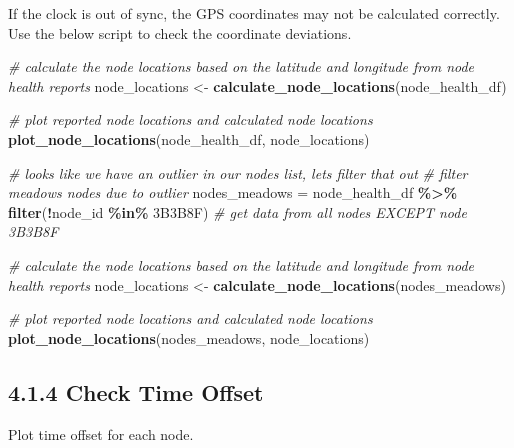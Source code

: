 \documentclass[
]{book}
\newenvironment{Shaded}{\begin{snugshade}}{\end{snugshade}}
\newcommand{\CommentTok}[1]{\textcolor[rgb]{0.56,0.35,0.01}{\textit{#1}}}
\newcommand{\FunctionTok}[1]{\textcolor[rgb]{0.13,0.29,0.53}{\textbf{#1}}}
\newcommand{\NormalTok}[1]{#1}
\newcommand{\OtherTok}[1]{\textcolor[rgb]{0.56,0.35,0.01}{#1}}
\newcommand{\SpecialCharTok}[1]{\textcolor[rgb]{0.81,0.36,0.00}{\textbf{#1}}}
\newcommand{\StringTok}[1]{\textcolor[rgb]{0.31,0.60,0.02}{#1}}
\begin{document}
If the clock is out of sync, the GPS coordinates may not be calculated correctly. Use the below script to check the coordinate deviations.

\begin{Shaded}
\begin{Highlighting}[]
\CommentTok{\# calculate the node locations based on the latitude and longitude from node health reports}
\NormalTok{node\_locations }\OtherTok{\textless{}{-}} \FunctionTok{calculate\_node\_locations}\NormalTok{(node\_health\_df)}

\CommentTok{\# plot reported node locations and calculated node locations}
\FunctionTok{plot\_node\_locations}\NormalTok{(node\_health\_df, node\_locations)}

\CommentTok{\# looks like we have an outlier in our nodes list, let\textquotesingle{}s filter that out}
\CommentTok{\# filter meadows nodes due to outlier}
\NormalTok{nodes\_meadows }\OtherTok{=}\NormalTok{ node\_health\_df }\SpecialCharTok{\%\textgreater{}\%}
  \FunctionTok{filter}\NormalTok{(}\SpecialCharTok{!}\NormalTok{node\_id }\SpecialCharTok{\%in\%} \StringTok{\textquotesingle{}3B3B8F\textquotesingle{}}\NormalTok{) }\CommentTok{\# get data from all nodes EXCEPT node 3B3B8F}

\CommentTok{\# calculate the node locations based on the latitude and longitude from node health reports}
\NormalTok{node\_locations }\OtherTok{\textless{}{-}} \FunctionTok{calculate\_node\_locations}\NormalTok{(nodes\_meadows)}

\CommentTok{\# plot reported node locations and calculated node locations}
\FunctionTok{plot\_node\_locations}\NormalTok{(nodes\_meadows, node\_locations)}
\end{Highlighting}
\end{Shaded}

\subsection{4.1.4 Check Time Offset}\label{check-time-offset}

Plot time offset for each node.
\end{document}

